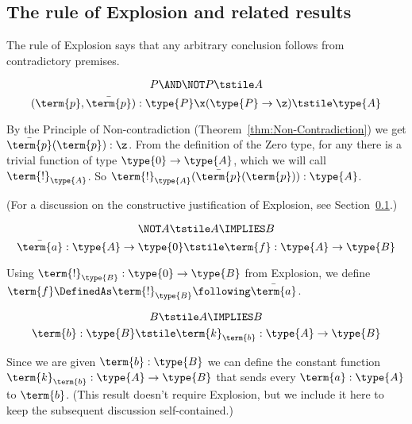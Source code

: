 \subsection{The rule of Explosion and related results}

The rule of Explosion says that any arbitrary conclusion follows from contradictory premises.

\begin{Theorem}[Explosion]
\[
P \AND \NOT P
\tstile
A
\]
\[
(\term{p}, \bar{\term{p}}):\type{P} \x (\type{P} \to \z)
\tstile
\type{A}
\]
\end{Theorem}
\begin{Proof}
By the Principle of Non-contradiction (Theorem~\ref{thm:Non-Contradiction}) we get 
$\bar{\term{p}}(\term{p}):\z$.  From the definition of the Zero type, for any  there is a trivial function of type $\type{0} \to \type{A}$, which we will call $\term{!}_{\type{A}}$.  So 
$\term{!}_{\type{A}}(\bar{\term{p}}(\term{p})):\type{A}$.

(For a discussion on the constructive justification of Explosion, see Section~\ref{}.)
\end{Proof}


\begin{Theorem}
\label{thm:A=>B-FalseA}
\[
\NOT A
\tstile
A \IMPLIES B
\]
\[
\bar{\term{a}}:\type{A} \to \type{0}
\tstile
\term{f}:\type{A} \to \type{B}
\]
\end{Theorem}
\begin{Proof}
Using $\term{!}_{\type{B}}: \type{0} \to \type{B}$ from Explosion, we define 
$\term{f} \DefinedAs \term{!}_{\type{B}} \following \bar{\term{a}}$.
\end{Proof}


\begin{Theorem}
\label{thm:A=>B-TrueB}
\[
B
\tstile
A \IMPLIES B
\]
\[
\term{b}:\type{B}
\tstile
\term{k}_{\term{b}}:\type{A} \to \type{B}
\]
\end{Theorem}
\begin{Proof}
Since we are given $\term{b}:\type{B}$ we can define the constant function $\term{k}_{\term{b}}:\type{A} \to \type{B}$ that sends every 
$\term{a}:\type{A}$ to $\term{b}$.  (This result doesn't require Explosion, but we include it here to keep the subsequent discussion self-contained.)
\end{Proof}

